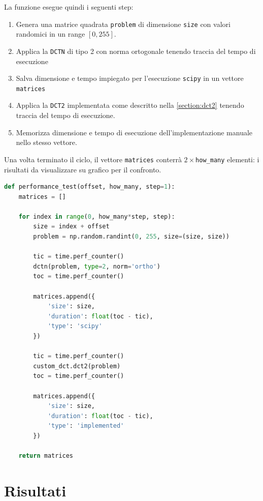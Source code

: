 \documentclass[11pt,italian]{article}
\begin{document}
\noindent
La funzione esegue quindi i seguenti step:
\begin{enumerate}
    \item Genera una matrice quadrata \lstinline{problem} di dimensione \lstinline{size} con valori randomici in un range $[0,255]$.
    \item Applica la \lstinline{DCTN} di tipo 2 con norma ortogonale tenendo traccia del tempo di esecuzione
    \item Salva dimensione e tempo impiegato per l'esecuzione \lstinline{scipy} in un vettore \lstinline{matrices}
    \item Applica la \lstinline{DCT2} implementata come descritto nella \cref{section:dct2} tenendo traccia del tempo di esecuzione.
    \item Memorizza dimensione e tempo di esecuzione dell'implementazione manuale nello stesso vettore.
\end{enumerate}
\noindent
Una volta terminato il ciclo, il vettore \lstinline{matrices} conterrà $2\times$\lstinline{how_many} elementi: i risultati da visualizzare su grafico per il confronto.

\begin{lstlisting}[language=python,emph={math,np},caption=Funzione per il confronto tra implementazioni]
def performance_test(offset, how_many, step=1):
    matrices = []

    for index in range(0, how_many*step, step):
        size = index + offset
        problem = np.random.randint(0, 255, size=(size, size))

        tic = time.perf_counter()
        dctn(problem, type=2, norm='ortho')
        toc = time.perf_counter()

        matrices.append({
            'size': size,
            'duration': float(toc - tic),
            'type': 'scipy'
        })

        tic = time.perf_counter()
        custom_dct.dct2(problem)
        toc = time.perf_counter()

        matrices.append({
            'size': size,
            'duration': float(toc - tic),
            'type': 'implemented'
        })

    return matrices
\end{lstlisting}

\section{Risultati}
\label{section:results}
\end{document}
